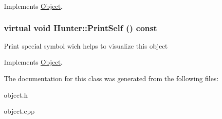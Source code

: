 Implements \hyperlink{classObject_a27d03e80827229de2ce885a0bc1c83c0}{Object}.

\hypertarget{classHunter_a9b193792622fd203df15bf755753e9bd}{
\subsubsection[{PrintSelf}]{\setlength{\rightskip}{0pt plus 5cm}virtual void Hunter::PrintSelf () const}}
\label{classHunter_a9b193792622fd203df15bf755753e9bd}
Print special symbol wich helps to visualize this object 

Implements \hyperlink{classObject_a2c63e79dfa8626451b4a04b0b72294eb}{Object}.



The documentation for this class was generated from the following files:\begin{DoxyCompactItemize}
\item 
object.h\item 
object.cpp\end{DoxyCompactItemize}
